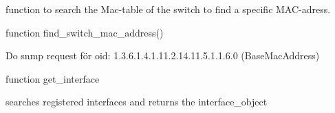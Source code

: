 \documentclass[letterpaper,10pt,english]{sphinxmanual}
\begin{document}
\begin{fulllineitems}
\begin{fulllineitems}
\begin{fulllineitems}
\label{Switch_Object:Switch_Object.Sw_Object.cl_switch_neighbors.name}
\end{fulllineitems}


\begin{fulllineitems}
\label{Switch_Object:Switch_Object.Sw_Object.cl_switch_neighbors.remote_interface}
\end{fulllineitems}


\end{fulllineitems}


\begin{fulllineitems}
\label{Switch_Object:Switch_Object.Sw_Object.find_my_mac_address}
function to search the Mac-table of the switch to find a specific MAC-adress.

\end{fulllineitems}


\begin{fulllineitems}
\label{Switch_Object:Switch_Object.Sw_Object.find_switch_mac_address}
function find\_switch\_mac\_address()

Do snmp request för oid: 1.3.6.1.4.1.11.2.14.11.5.1.1.6.0 (BaseMacAddress)

\end{fulllineitems}


\begin{fulllineitems}
\label{Switch_Object:Switch_Object.Sw_Object.get_interface}
function get\_interface

searches registered interfaces and returns the interface\_object

\end{fulllineitems}


\end{fulllineitems}
\end{document}
